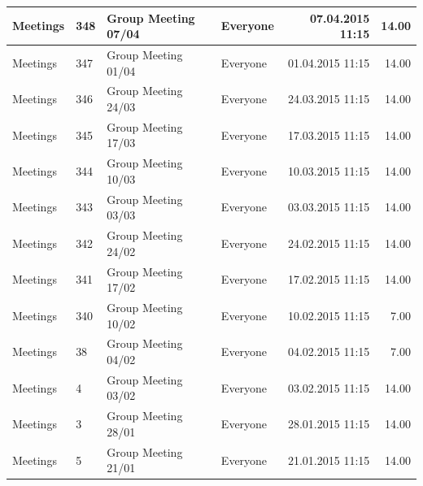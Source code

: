 \documentclass[a4paper]{article}
\begin{document}
\begin{landscape}
\begin{center}
\begin{tabular}{|l|l|l|l|l|l|}
Meetings &  348 & Group Meeting 07/04 & Everyone & \multicolumn{1}{r|}{07.04.2015 11:15} & \multicolumn{1}{r|}{14.00} \\ \hline
Meetings &  347 & Group Meeting 01/04 & Everyone & \multicolumn{1}{r|}{01.04.2015 11:15} & \multicolumn{1}{r|}{14.00} \\ \hline
Meetings &  346 & Group Meeting 24/03 & Everyone & \multicolumn{1}{r|}{24.03.2015 11:15} & \multicolumn{1}{r|}{14.00} \\ \hline
Meetings &  345 & Group Meeting 17/03 & Everyone & \multicolumn{1}{r|}{17.03.2015 11:15} & \multicolumn{1}{r|}{14.00} \\ \hline
Meetings &  344 & Group Meeting 10/03 & Everyone & \multicolumn{1}{r|}{10.03.2015 11:15} & \multicolumn{1}{r|}{14.00} \\ \hline
Meetings &  343 & Group Meeting 03/03 & Everyone & \multicolumn{1}{r|}{03.03.2015 11:15} & \multicolumn{1}{r|}{14.00} \\ \hline
Meetings &  342 & Group Meeting 24/02 & Everyone & \multicolumn{1}{r|}{24.02.2015 11:15} & \multicolumn{1}{r|}{14.00} \\ \hline
Meetings &  341 & Group Meeting 17/02 & Everyone & \multicolumn{1}{r|}{17.02.2015 11:15} & \multicolumn{1}{r|}{14.00} \\ \hline
Meetings &  340 & Group Meeting 10/02 & Everyone & \multicolumn{1}{r|}{10.02.2015 11:15} & \multicolumn{1}{r|}{7.00} \\ \hline
Meetings &  38 & Group Meeting 04/02 & Everyone & \multicolumn{1}{r|}{04.02.2015 11:15} & \multicolumn{1}{r|}{7.00} \\ \hline
Meetings &  4 & Group Meeting 03/02 & Everyone & \multicolumn{1}{r|}{03.02.2015 11:15} & \multicolumn{1}{r|}{14.00} \\ \hline
Meetings &  3 & Group Meeting 28/01 & Everyone & \multicolumn{1}{r|}{28.01.2015 11:15} & \multicolumn{1}{r|}{14.00} \\ \hline
Meetings &  5 & Group Meeting 21/01 & Everyone & \multicolumn{1}{r|}{21.01.2015 11:15} & \multicolumn{1}{r|}{14.00} \\ \hline
\end{tabular}
\end{center}



\end{landscape}
\end{document}
